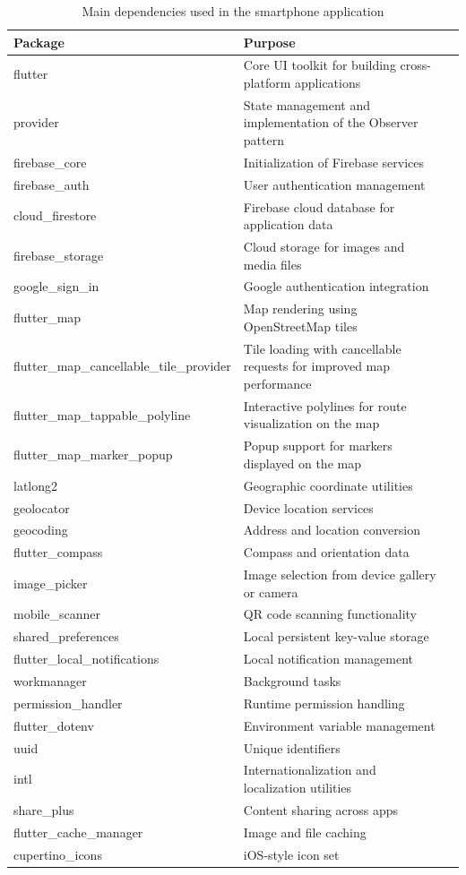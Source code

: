 \clearpage
\begin{table}[h]
\centering
\begin{tabular}{|l|p{6cm}|l|}
\hline
\textbf{Package} & \textbf{Purpose} \\
\hline

flutter & Core UI toolkit for building cross-platform applications \\
\hline
provider & State management and implementation of the Observer pattern  \\
\hline
firebase\_core & Initialization of Firebase services \\
\hline
firebase\_auth & User authentication management  \\
\hline
cloud\_firestore & Firebase cloud database for application data \\
\hline
firebase\_storage & Cloud storage for images and media files \\
\hline
google\_sign\_in & Google authentication integration \\
\hline
flutter\_map & Map rendering using OpenStreetMap tiles  \\
\hline




\hline
flutter\_map\_cancellable\_tile\_provider & Tile loading with cancellable requests for improved map performance \\
\hline
flutter\_map\_tappable\_polyline & Interactive polylines for route visualization on the map \\
\hline
flutter\_map\_marker\_popup & Popup support for markers displayed on the map \\
\hline
latlong2 & Geographic coordinate utilities \\
\hline
geolocator & Device location services \\
\hline
geocoding & Address and location conversion \\
\hline
flutter\_compass & Compass and orientation data \\
\hline
image\_picker & Image selection from device gallery or camera \\
\hline
mobile\_scanner & QR code scanning functionality \\
\hline
shared\_preferences & Local persistent key-value storage \\
\hline
flutter\_local\_notifications & Local notification management \\
\hline
workmanager & Background tasks \\
\hline
permission\_handler & Runtime permission handling \\
\hline
flutter\_dotenv & Environment variable management \\
\hline
uuid & Unique identifiers\\
\hline
intl & Internationalization and localization utilities \\
\hline
share\_plus & Content sharing across apps \\
\hline
flutter\_cache\_manager & Image and file caching \\
\hline
cupertino\_icons & iOS-style icon set \\
\hline
\end{tabular}
\caption{Main dependencies used in the smartphone application}
\end{table}
